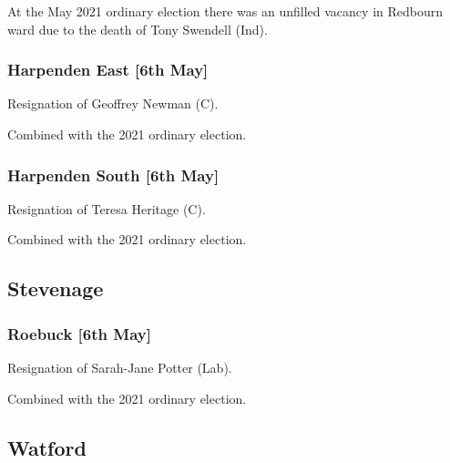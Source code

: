 \documentclass[a4paper,openany]{book}
\begin{document}
\begin{resultsiii}
At the May 2021 ordinary election there was an unfilled vacancy in Redbourn ward due to the death of Tony Swendell (Ind).

\subsubsection*{Harpenden East \hspace*{\fill}\nolinebreak[1]%
	\enspace\hspace*{\fill}
	[6th May]}


Resignation of Geoffrey Newman (C).

Combined with the 2021 ordinary election.

\subsubsection*{Harpenden South \hspace*{\fill}\nolinebreak[1]%
	\enspace\hspace*{\fill}
	[6th May]}


Resignation of Teresa Heritage (C).

Combined with the 2021 ordinary election.

\subsection*{Stevenage}

\subsubsection*{Roebuck \hspace*{\fill}\nolinebreak[1]%
	\enspace\hspace*{\fill}
	[6th May]}


Resignation of Sarah-Jane Potter (Lab).

Combined with the 2021 ordinary election.

\subsection*{Watford}


\end{resultsiii}
\end{document}
